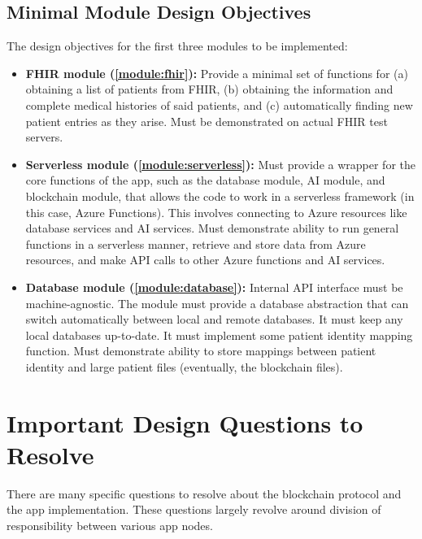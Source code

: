 \documentclass[12pt]{article}
\begin{document}
\subsection{Minimal Module Design Objectives}
The design objectives for the first three modules to be implemented:
\begin{itemize}
\item {\bf FHIR module (\ref{module:fhir}):} Provide a minimal set of functions for (a) obtaining a list of patients from FHIR, (b) obtaining the information and complete medical histories of said patients, and (c) automatically finding new patient entries as they arise. Must be demonstrated on actual FHIR test servers.

\item {\bf Serverless module (\ref{module:serverless}):} Must provide a wrapper for the core functions of the app, such as the database module, AI module, and blockchain module, that allows the code to work in a serverless framework (in this case, Azure Functions). This involves connecting to Azure resources like database services and AI services. Must demonstrate ability to run general functions in a serverless manner, retrieve and store data from Azure resources, and make API calls to other Azure functions and AI services.

\item {\bf Database module (\ref{module:database}):} Internal API interface must be machine-agnostic. The module must provide a database abstraction that can switch automatically between local and remote databases. It must keep any local databases up-to-date. It must implement some patient identity mapping function. Must demonstrate ability to store mappings between patient identity and large patient files (eventually, the blockchain files).
\end{itemize}

\section{Important Design Questions to Resolve}

There are many specific questions to resolve about the blockchain protocol and the app implementation. These questions largely revolve around division of responsibility between various app nodes.
\end{document}
